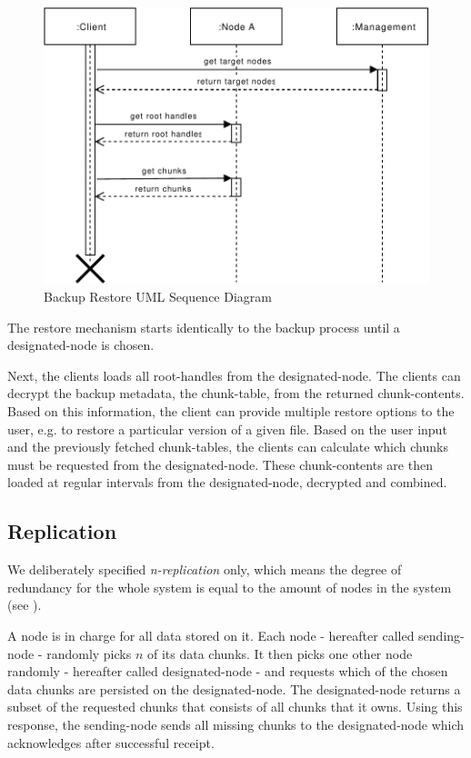 \begin{figure}[h]
    \centering
    \includegraphics[width=\linewidth]{resources/backup_restore.pdf}
    \caption{Backup Restore UML Sequence Diagram}
\end{figure}

The restore mechanism starts identically to the backup process until a \gls{designated-node} is chosen.

Next, the \glspl{client} loads all \glspl{root-handle} from the \gls{designated-node}. The \glspl{client} can decrypt the backup metadata, the \gls{chunk-table}, from the returned \glspl{chunk-content}. Based on this information, the \gls{client} can provide multiple restore options to the \gls{user}, e.g. to restore a particular version of a given file.
Based on the user input and the previously fetched \glspl{chunk-table}, the \glspl{client} can calculate which \glspl{chunk} must be requested from the \gls{designated-node}. These \glspl{chunk-content} are then loaded at regular intervals from the \gls{designated-node}, decrypted and combined.

\subsection{Replication}\label{sec:replication}

We deliberately specified \emph{n-replication} only, which means the degree of redundancy for the whole system is equal to the amount of \glspl{node} in the system (see ).

A \gls{node} is in charge for all data stored on it. Each \gls{node} - hereafter called \gls{sending-node} - randomly picks $n$ of its data \glspl{chunk}. It then picks one other \gls{node} randomly - hereafter called \gls{designated-node} - and requests which of the chosen data \glspl{chunk} are persisted on the \gls{designated-node}. The \gls{designated-node} returns a subset of the requested \glspl{chunk} that consists of all \glspl{chunk} that it owns. Using this response, the \gls{sending-node} sends all missing \glspl{chunk} to the \gls{designated-node} which acknowledges after successful receipt.

